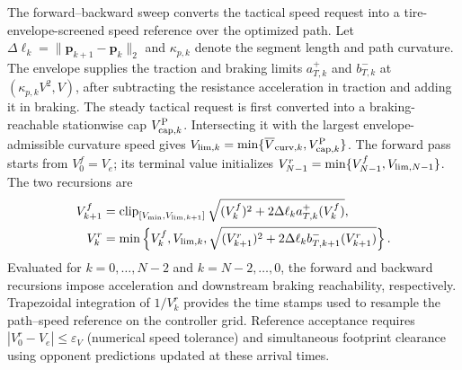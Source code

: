 \documentclass[sensors,article,submit,moreauthors]{Definitions/mdpi}
\begin{document}
The forward--backward sweep converts the tactical speed request into a
tire-envelope-screened speed reference over the optimized path. Let
$\Delta\ell_k=\|\bm p_{k+1}-\bm p_k\|_2$ and $\kappa_{p,k}$ denote the segment
length and path curvature. The envelope supplies the traction and
braking limits \(a_{T,k}^{+}\) and \(b_{T,k}^{-}\) at
\((\kappa_{p,k}V^2,V)\), after subtracting the resistance acceleration in
traction and adding it in braking.
The steady tactical request is first converted into a braking-reachable
stationwise cap $V_{{\rm cap},k}^{\rm P}$. Intersecting it with the largest
envelope-admissible curvature speed gives
$V_{{\rm lim},k}=\min\{\overline V_{{\rm curv},k},
V_{{\rm cap},k}^{\rm P}\}$. The forward pass starts from $V_0^f=V_e$;
its terminal value initializes
$V_{N-1}^r=\min\{V_{N-1}^{f},V_{{\rm lim},N-1}\}$. The two recursions are
\begin{equation}
\begin{aligned}
V_{k+1}^{f}&=\operatorname{clip}_{[V_{\min},V_{{\rm lim},k+1}]}
\sqrt{(V_k^f)^2+2\Delta\ell_k a_{T,k}^{+}(V_k^f)},\\
V_k^r&=\min\left\{V_k^f,V_{{\rm lim},k},
\sqrt{(V_{k+1}^r)^2+
2\Delta\ell_k b_{T,k+1}^{-}(V_{k+1}^r)}\right\}.
\end{aligned}
\label{eq:execution_speed_sweep}
\end{equation}
Evaluated for $k=0,\ldots,N-2$ and $k=N-2,\ldots,0$, the forward and backward
recursions impose acceleration and downstream braking reachability,
respectively. Trapezoidal integration of $1/V_k^r$ provides the time stamps
used to resample the path--speed reference on the controller grid.
Reference acceptance requires $|V_0^r-V_e|\le\varepsilon_V$
(numerical speed tolerance) and simultaneous footprint clearance using
opponent predictions updated at these arrival times.
\end{document}
